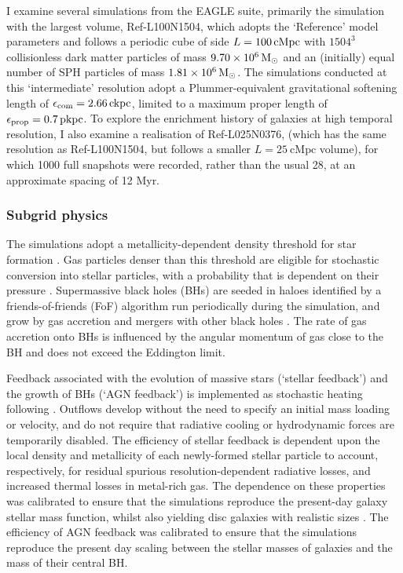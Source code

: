 I examine several simulations from the EAGLE suite, primarily the simulation with the largest volume, Ref-L100N1504, which adopts the `Reference' model parameters \citep[see][]{2015MNRAS.446..521S} and follows a periodic cube of side $L = 100\,{\rm cMpc}$ with $1504^3$ collisionless dark matter particles of mass $9.70\times 10^6\,{\rm M}_\odot$ and an (initially) equal number of SPH particles of mass $1.81\times 10^6\,{\rm M}_\odot$. The simulations conducted at this `intermediate' resolution adopt a Plummer-equivalent gravitational softening length of $\epsilon_{\rm com} = 2.66\,{\rm ckpc}$, limited to a maximum proper length of $\epsilon_{\rm prop} = 0.7\,{\rm pkpc}$. To explore the enrichment history of galaxies at high temporal resolution, I also examine a realisation of Ref-L025N0376, (which has the same resolution as Ref-L100N1504, but follows a smaller $L=25\ \mathrm{cMpc}$ volume), for which 1000 full snapshots were recorded, rather than the usual 28, at an approximate spacing of 12 Myr. 

\subsubsection{Subgrid physics}
\label{sec:subgrid_physics}

The simulations adopt a metallicity-dependent density threshold for star formation \citep{2004ApJ...609..667S}. Gas particles denser than this threshold are eligible for stochastic conversion into stellar particles, with a probability that is dependent on their pressure \citep{2008MNRAS.383.1210S}. Supermassive black holes (BHs) are seeded in haloes identified by a friends-of-friends (FoF) algorithm run periodically during the simulation, and grow by gas accretion and mergers with other black holes \citep[see, e.g.][]{2005MNRAS.361..776S,2009MNRAS.398...53B,2015MNRAS.446..521S}. The rate of gas accretion onto BHs is influenced by the angular momentum of gas close to the BH \citep[see ][]{2015MNRAS.454.1038R} and does not exceed the Eddington limit.

Feedback associated with the evolution of massive stars (`stellar feedback') and the growth of BHs (`AGN feedback') is implemented as stochastic heating following \citet{2012MNRAS.426..140D}. Outflows develop without the need to specify an initial mass loading or velocity, and do not require that radiative cooling or hydrodynamic forces are temporarily disabled. The efficiency of stellar feedback is dependent upon the local density and metallicity of each newly-formed stellar particle to account, respectively, for residual spurious resolution-dependent radiative losses, and increased thermal losses in metal-rich gas. The dependence on these properties was calibrated to ensure that the simulations reproduce the present-day galaxy stellar mass function, whilst also yielding disc galaxies with realistic sizes \citep{2015MNRAS.450.1937C}. The efficiency of AGN feedback was calibrated to ensure that the simulations reproduce the present day scaling between the stellar masses of galaxies and the mass of their central BH. 

